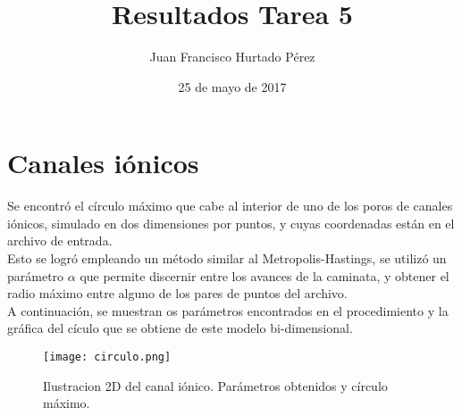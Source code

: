 \documentclass{article}
\title{Resultados Tarea 5}
\author{Juan Francisco Hurtado P\'erez}
\date{25 de mayo de 2017}
\begin{document}
\maketitle

\section{Canales i\'onicos}
Se encontr\'o el c\'irculo m\'aximo que cabe al interior de uno de los poros de canales i\'onicos, simulado en dos dimensiones por puntos, y cuyas coordenadas est\'an en el archivo de entrada.\\
Esto se logr\'o empleando un m\'etodo similar al Metropolis-Hastings, se utiliz\'o un par\'ametro $\alpha$ que permite discernir entre los avances de la caminata, y obtener el radio m\'aximo entre alguno de los pares de puntos del archivo.\\
A continuaci\'on, se muestran os par\'ametros encontrados en el procedimiento y la gr\'afica del c\'iculo que se obtiene de este modelo bi-dimensional.\\
\begin{figure}
    \centering
    \texttt{[image: circulo.png]}
    \caption{Ilustracion 2D del canal i\'onico. Par\'ametros obtenidos y c\'irculo m\'aximo.}
\end{figure}
\end{document}
